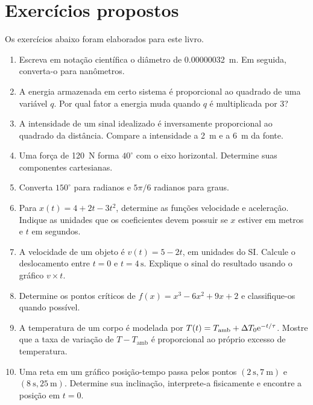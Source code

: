 \section{Exercícios propostos}

Os exercícios abaixo foram elaborados para este livro.

\begin{enumerate}
  \item Escreva em notação científica o diâmetro de \SI{0.00000032}{\meter}. Em seguida, converta-o para nanômetros.

  \item A energia armazenada em certo sistema é proporcional ao quadrado de uma variável $q$. Por qual fator a energia muda quando $q$ é multiplicada por 3?

  \item A intensidade de um sinal idealizado é inversamente proporcional ao quadrado da distância. Compare a intensidade a \SI{2}{\meter} e a \SI{6}{\meter} da fonte.

  \item Uma força de \SI{120}{\newton} forma $40^\circ$ com o eixo horizontal. Determine suas componentes cartesianas.

  \item Converta $150^\circ$ para radianos e $5\pi/6$ radianos para graus.

  \item Para $x(t)=4+2t-3t^2$, determine as funções velocidade e aceleração. Indique as unidades que os coeficientes devem possuir se $x$ estiver em metros e $t$ em segundos.

  \item A velocidade de um objeto é $v(t)=5-2t$, em unidades do SI. Calcule o deslocamento entre $t=0$ e $t=4\,\si{\second}$. Explique o sinal do resultado usando o gráfico $v\times t$.

  \item Determine os pontos críticos de $f(x)=x^3-6x^2+9x+2$ e classifique-os quando possível.

  \item A temperatura de um corpo é modelada por $T(t)=T_{\mathrm{amb}}+\Delta T_0\mathrm{e}^{-t/\tau}$. Mostre que a taxa de variação de $T-T_{\mathrm{amb}}$ é proporcional ao próprio excesso de temperatura.

  \item Uma reta em um gráfico posição-tempo passa pelos pontos $(\SI{2}{\second},\SI{7}{\meter})$ e $(\SI{8}{\second},\SI{25}{\meter})$. Determine sua inclinação, interprete-a fisicamente e encontre a posição em $t=0$.
\end{enumerate}
